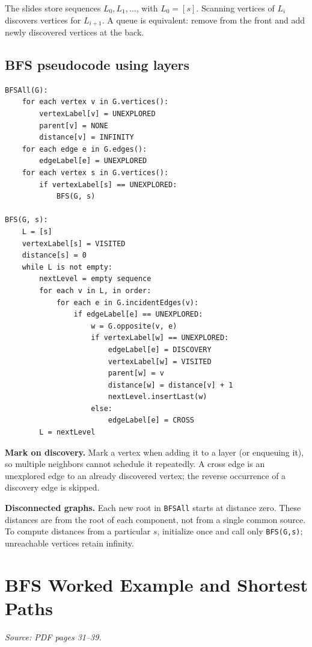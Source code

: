 \documentclass[11pt,letterpaper]{article}
\newcommand{\sourcepages}[1]{\textit{Source: PDF pages #1.}}
\newcommand{\method}[1]{\texttt{#1}}
\begin{document}
The slides store sequences $L_0,L_1,\ldots$, with $L_0=[s]$. Scanning vertices of $L_i$ discovers vertices for $L_{i+1}$. A queue is equivalent: remove from the front and add newly discovered vertices at the back.

\subsection{BFS pseudocode using layers}
\begin{lstlisting}
BFSAll(G):
    for each vertex v in G.vertices():
        vertexLabel[v] = UNEXPLORED
        parent[v] = NONE
        distance[v] = INFINITY
    for each edge e in G.edges():
        edgeLabel[e] = UNEXPLORED
    for each vertex s in G.vertices():
        if vertexLabel[s] == UNEXPLORED:
            BFS(G, s)

BFS(G, s):
    L = [s]
    vertexLabel[s] = VISITED
    distance[s] = 0
    while L is not empty:
        nextLevel = empty sequence
        for each v in L, in order:
            for each e in G.incidentEdges(v):
                if edgeLabel[e] == UNEXPLORED:
                    w = G.opposite(v, e)
                    if vertexLabel[w] == UNEXPLORED:
                        edgeLabel[e] = DISCOVERY
                        vertexLabel[w] = VISITED
                        parent[w] = v
                        distance[w] = distance[v] + 1
                        nextLevel.insertLast(w)
                    else:
                        edgeLabel[e] = CROSS
        L = nextLevel
\end{lstlisting}
\textbf{Mark on discovery.} Mark a vertex when adding it to a layer (or enqueuing it), so multiple neighbors cannot schedule it repeatedly. A cross edge is an unexplored edge to an already discovered vertex; the reverse occurrence of a discovery edge is skipped.

\textbf{Disconnected graphs.} Each new root in \method{BFSAll} starts at distance zero. These distances are from the root of each component, not from a single common source. To compute distances from a particular $s$, initialize once and call only \method{BFS(G,s)}; unreachable vertices retain infinity.

\clearpage
\section{BFS Worked Example and Shortest Paths}
\sourcepages{31--39}
\end{document}
